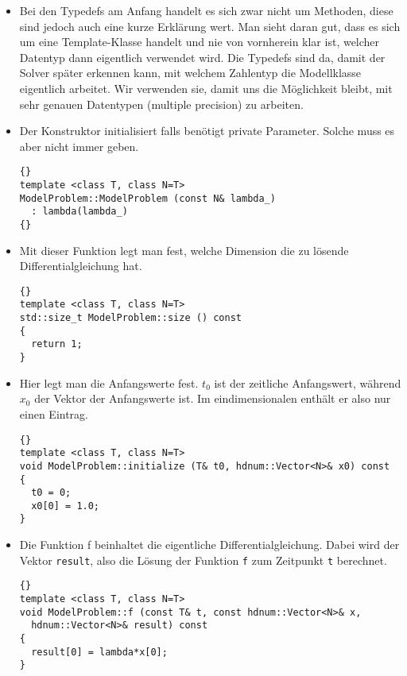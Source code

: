 \documentclass[a4paper,11pt]{article}
\theoremstyle{definition}
\begin{document}
\begin{itemize}
\item Bei den Typedefs am Anfang handelt es sich zwar nicht um
  Methoden, diese sind jedoch auch eine kurze Erklärung wert. Man
  sieht daran gut, dass es sich um eine Template-Klasse handelt und
  nie von vornherein klar ist, welcher Datentyp dann eigentlich
  verwendet wird. Die Typedefs sind da, damit der Solver später
  erkennen kann, mit welchem Zahlentyp die Modellklasse eigentlich
  arbeitet. Wir verwenden sie, damit uns die Möglichkeit bleibt, mit
  sehr genauen Datentypen (multiple precision) zu arbeiten.

\item Der Konstruktor initialisiert falls benötigt private
  Parameter. Solche muss es aber nicht immer geben.

  {\footnotesize{\begin{lstlisting}{}
template <class T, class N=T>
ModelProblem::ModelProblem (const N& lambda_)
  : lambda(lambda_)
{}
\end{lstlisting}}}

\item Mit dieser Funktion legt man fest, welche Dimension die zu
  lösende Differentialgleichung hat.

{\footnotesize{\begin{lstlisting}{}
template <class T, class N=T>
std::size_t ModelProblem::size () const
{
  return 1;
}
\end{lstlisting}}}

\item Hier legt man die Anfangswerte fest. $t_0$ ist der zeitliche
  Anfangswert, während $x_0$ der Vektor der Anfangswerte ist. Im
  eindimensionalen enthält er also nur einen Eintrag.

{\footnotesize{\begin{lstlisting}{}
template <class T, class N=T>
void ModelProblem::initialize (T& t0, hdnum::Vector<N>& x0) const
{
  t0 = 0;
  x0[0] = 1.0;
}
\end{lstlisting}}}

\item Die Funktion f beinhaltet die eigentliche
  Differentialgleichung. Dabei wird der Vektor \lstinline{result},
  also die Lösung der Funktion \lstinline{f} zum Zeitpunkt
  \lstinline{t} berechnet.

{\footnotesize{\begin{lstlisting}{}
template <class T, class N=T>
void ModelProblem::f (const T& t, const hdnum::Vector<N>& x,
  hdnum::Vector<N>& result) const
{
  result[0] = lambda*x[0];
}
\end{lstlisting}}}


\end{itemize}
\end{document}
